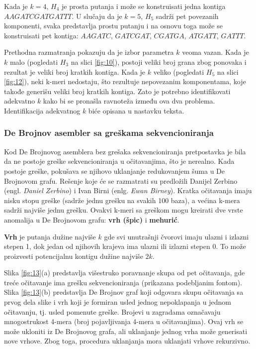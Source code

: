 \documentclass[12pt,oneside]{memoir}
\begin{document}
Kada je $k = 4$, $H_4$ je prosta putanja i može se konstruisati jedna kontiga $AAGATCGATGATTT$. U slučaju da je $k = 5$, $H_5$ sadrži pet povezanih komponenti, svaka predstavlja prostu putanju i na osnovu toga može se konstruisati pet kontiga: $AAGATC$, $GATCGAT$, $CGATGA$, $ATGATT$, $GATTT$.

Prethodna razmatranja pokazuju da je izbor parametra $k$ veoma vazan. Kada je $k$ malo (pogledati $H_3$ na slici \ref{fig:10}), postoji veliki broj grana zbog ponovaka i rezultat je veliki broj kratkih kontiga. Kada je $k$ veliko (pogledati $H_5$ na slici \ref{fig:12}), neki k-meri nedostaju, što rezultuje nepovezanim komponentama, koje takođe generišu veliki broj kratkih kontiga. Zato je potrebno identifikovati adekvatno $k$ kako bi se pronašla ravnoteža između ova dva problema. Identifikacija adekvatnog $k$ biće opisana u nastavku teksta.

\subsubsection{De Brojnov asembler sa greškama sekvencioniranja}

Kod De Brojnovog asemblera bez grešaka sekvencioniranja pretpostavka je bila da ne postoje greške sekvencioniranja u očitavanjima, što je nerealno. Kada postoje greške, pokušava se njihovo uklanjanje redukovanjem šuma u De Brojnovom grafu. Rešenje koje će se razmatrati su predložili Danijel Zerbino (engl. \textit{Daniel Zerbino}) i Ivan Birni (enlg. \textit{Ewan Birney}). Kratka očitavanja imaju nisku stopu greške (sadrže jednu grešku na svakih 100 baza), a većina k-mera sadrži najviše jednu grešku. Ovakvi k-meri sa greškom mogu kreirati dve vrste anomalija u De Brojnovom grafu: \textbf{vrh (špic)} i \textbf{mehurić}.

\textbf{Vrh} je putanja dužine najviše $k$ gde svi unutrašnji čvorovi imaju ulazni i izlazni stepen 1, dok jedan od njihovih krajeva ima ulazni ili izlazni stepen 0. To može proizvesti potencijalnu kontigu dužine najviše $2k$.

Slika \ref{fig:13}(a) predstavlja višestruko poravnanje skupa od pet očitavanja, gde treće očitavanje ima grešku sekvencioniranja (prikazana podebljanim fontom). Slika \ref{fig:13}(b) predstavlja De Brojnov graf koji odgovara skupu očitavanja sa prvog dela slike i vrh koji je formiran usled jednog nepoklapanja u jednom očitavanju, tj. usled pomenute greške. Brojevi u zagradama označavaju mnogostrukost 4-mera (broj pojavljivanja 4-mera u očitavanjima). Ovaj vrh se može ukloniti iz De Brojnovog grafa, ali uklanjanje jednog vrha može generisati nove vrhove. Zbog toga, procedura uklanjanja mora uklanjati vrhove rekurzivno.
\end{document}

